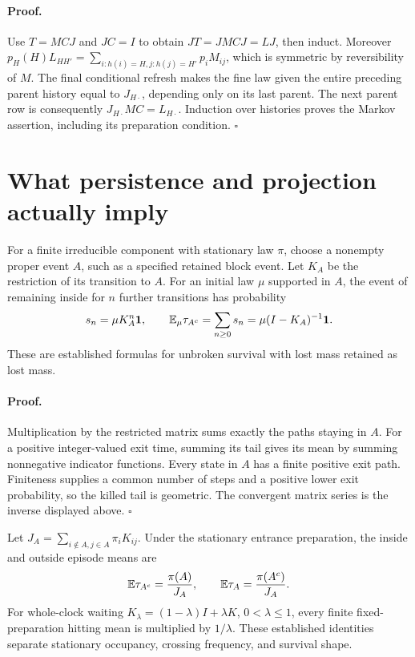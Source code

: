 \paragraph{Proof.}
Use \(T=MCJ\) and \(JC=I\) to obtain \(JT=JMCJ=LJ\), then
induct. Moreover
\(p_H(H)L_{HH'}=\sum_{i:h(i)=H,j:h(j)=H'}p_iM_{ij}\), which is
symmetric by reversibility of \(M\). The final conditional refresh makes
the fine law given the entire preceding parent history equal to
\(J_{H\cdot}\), depending only on its last parent. The next parent row
is consequently \(J_{H\cdot}MC=L_{H\cdot}\). Induction over histories
proves the Markov assertion, including its preparation condition.
\(\square\)

\section{What persistence and projection actually imply}
\label{sec:rg-memory-persistence}

For a finite irreducible component with stationary law \(\pi\), choose a
nonempty proper event \(A\), such as a specified retained block event.
Let \(K_A\) be the restriction of its transition to \(A\). For an
initial law \(\mu\) supported in \(A\), the event of remaining inside
for \(n\) further transitions has probability
\begin{equation}
 s_n=\mu K_A^n\mathbf1,\qquad
 \mathbb E_\mu\tau_{A^c}=\sum_{n\geq0}s_n
                 =\mu(I-K_A)^{-1}\mathbf1.
\label{eq:rg-memory-killed-survival}
\end{equation}
These are established formulas for unbroken survival with lost mass retained
as lost mass. 

\paragraph{Proof.}
Multiplication by the restricted matrix sums exactly the paths staying in
\(A\). For a positive integer-valued exit time, summing its tail gives
its mean by summing nonnegative indicator functions. Every state in \(A\)
has a finite positive exit path. Finiteness supplies a common number of steps
and a positive lower exit probability, so the killed tail is geometric.
The convergent matrix series is the inverse displayed above. \(\square\)

Let \(J_A=\sum_{i\notin A,j\in A}\pi_iK_{ij}\). Under the stationary
entrance preparation, the inside and outside episode means are
\begin{equation}
 \mathbb E\tau_{A^c}=\frac{\pi(A)}{J_A},\qquad
 \mathbb E\tau_A=\frac{\pi(A^c)}{J_A}.
\label{eq:rg-memory-stationary-episodes}
\end{equation}
For whole-clock waiting \(K_\lambda=(1-\lambda)I+\lambda K\),
\(0<\lambda\leq1\), every finite fixed-preparation hitting mean is
multiplied by \(1/\lambda\). These established identities separate
stationary occupancy, crossing frequency, and survival shape.

